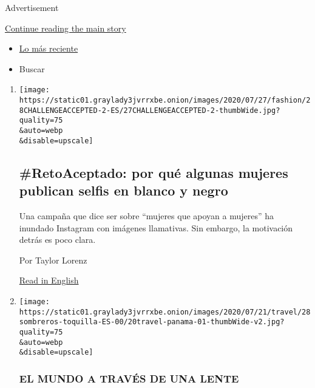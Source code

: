 Advertisement

\protect\hyperlink{after-mid1}{Continue reading the main story}

\begin{itemize}
\tightlist
\item
  \protect\hyperlink{stream-panel}{Lo más reciente}
\item
  Buscar
\end{itemize}

\begin{enumerate}
\def\labelenumi{\arabic{enumi}.}
\item
  \href{/es/2020/07/28/espanol/estilos-de-vida/reto-selfi-blanco-negro.html}{}

  \texttt{[image: https://static01.graylady3jvrrxbe.onion/images/2020/07/27/fashion/28CHALLENGEACCEPTED-2-ES/27CHALLENGEACCEPTED-2-thumbWide.jpg?quality=75\\\&auto=webp\\\&disable=upscale]}

  \hypertarget{retoaceptado-por-quuxe9-algunas-mujeres-publican-selfis-en-blanco-y-negro}{%
  \subsection{\#RetoAceptado: por qué algunas mujeres publican selfis en
  blanco y
  negro}\label{retoaceptado-por-quuxe9-algunas-mujeres-publican-selfis-en-blanco-y-negro}}

  Una campaña que dice ser sobre ``mujeres que apoyan a mujeres'' ha
  inundado Instagram con imágenes llamativas. Sin embargo, la motivación
  detrás es poco clara.

  Por Taylor Lorenz

  \href{https://www.nytimes3xbfgragh.onion/2020/07/27/style/challenge-accepted-instagram.html}{Read
  in English}
\item
  \href{/es/2020/07/28/espanol/estilos-de-vida/sombreros-toquilla-panama-ecuador.html}{}

  \texttt{[image: https://static01.graylady3jvrrxbe.onion/images/2020/07/21/travel/28sombreros-toquilla-ES-00/20travel-panama-01-thumbWide-v2.jpg?quality=75\\\&auto=webp\\\&disable=upscale]}

  \hypertarget{el-mundo-a-travuxe9s-de-una-lente}{%
  \subsubsection{EL MUNDO A TRAVÉS DE UNA
  LENTE}\label{el-mundo-a-travuxe9s-de-una-lente}}

  \hypertarget{una-visita-a-los-talleres-de-los-mejores-fabricantes-de-sombreros-en-ecuador}{%
}
\end{enumerate}
